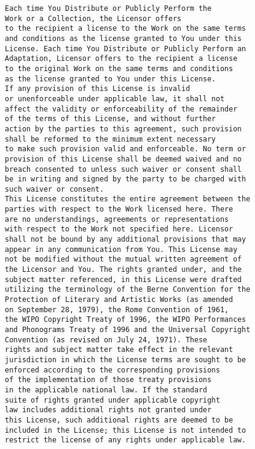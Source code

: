 \begin{verbatim}
Each time You Distribute or Publicly Perform the
Work or a Collection, the Licensor offers
to the recipient a license to the Work on the same terms
and conditions as the license granted to You under this
License. Each time You Distribute or Publicly Perform an
Adaptation, Licensor offers to the recipient a license
to the original Work on the same terms and conditions
as the license granted to You under this License.
If any provision of this License is invalid
or unenforceable under applicable law, it shall not
affect the validity or enforceability of the remainder
of the terms of this License, and without further
action by the parties to this agreement, such provision
shall be reformed to the minimum extent necessary
to make such provision valid and enforceable. No term or
provision of this License shall be deemed waived and no
breach consented to unless such waiver or consent shall
be in writing and signed by the party to be charged with
such waiver or consent.
This License constitutes the entire agreement between the
parties with respect to the Work licensed here. There
are no understandings, agreements or representations
with respect to the Work not specified here. Licensor
shall not be bound by any additional provisions that may
appear in any communication from You. This License may
not be modified without the mutual written agreement of
the Licensor and You. The rights granted under, and the
subject matter referenced, in this License were drafted 
utilizing the terminology of the Berne Convention for the
Protection of Literary and Artistic Works (as amended
on September 28, 1979), the Rome Convention of 1961,
the WIPO Copyright Treaty of 1996, the WIPO Performances
and Phonograms Treaty of 1996 and the Universal Copyright
Convention (as revised on July 24, 1971). These
rights and subject matter take effect in the relevant
jurisdiction in which the License terms are sought to be
enforced according to the corresponding provisions
of the implementation of those treaty provisions
in the applicable national law. If the standard
suite of rights granted under applicable copyright
law includes additional rights not granted under 
this License, such additional rights are deemed to be 
included in the License; this License is not intended to
restrict the license of any rights under applicable law.

\end{verbatim}

